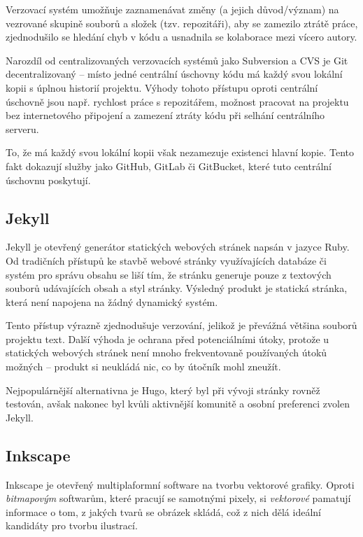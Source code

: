 \documentclass[a4paper, 12pt]{article}
\begin{document}
  Verzovací systém umožňuje zaznamenávat změny (a jejich důvod/význam) na vezrované skupině souborů a složek (tzv. repozitáři), aby se zamezilo ztrátě práce, zjednodušilo se hledání chyb v kódu a usnadnila se kolaborace mezi vícero autory.

  Narozdíl od centralizovaných verzovacích systémů jako Subversion a CVS je Git decentralizovaný -- místo jedné centrální úschovny kódu má každý svou lokální kopii s úplnou historií projektu. Výhody tohoto přístupu oproti centrální úschovně jsou např. rychlost práce s repozitářem, možnost pracovat na projektu bez internetového připojení a zamezení ztráty kódu při selhání centrálního serveru\cite{cvcs-vs-dvcs}.

  To, že má každý svou lokální kopii však nezamezuje existenci hlavní kopie. Tento fakt dokazují služby jako GitHub, GitLab či GitBucket, které tuto centrální úschovnu poskytují.


  \subsection{Jekyll} \label{sec:Jekyll}
  Jekyll je otevřený\cite{jekyll-source} generátor statických webových stránek napsán v jazyce Ruby. Od tradičních přístupů ke stavbě webové stránky využívajících databáze či systém pro správu obsahu se liší tím, že stránku generuje pouze z textových souborů udávajících obsah a styl stránky. Výsledný produkt je statická stránka, která není napojena na žádný dynamický systém.

  Tento přístup výrazně zjednodušuje verzování, jelikož je převážná většina souborů projektu text. Další výhoda je ochrana před potenciálními útoky, protože u statických webových stránek není mnoho frekventovaně používaných útoků možných -- produkt si neukládá nic, co by útočník mohl zneužít.

  Nejpopulárnější alternativna je Hugo, který byl při vývoji stránky rovněž testován, avšak nakonec byl kvůli aktivnější komunitě a osobní preferenci zvolen Jekyll.


  \subsection{Inkscape} \label{sec:Inkscape}
  Inkscape je otevřený\cite{inkscape-source} multiplaformní software na tvorbu vektorové grafiky. Oproti \emph{bitmapovým} softwarům, které pracují se samotnými pixely, si \emph{vektorové} pamatují informace o tom, z jakých tvarů se obrázek skládá, což z nich dělá ideální kandidáty pro tvorbu ilustrací.
\end{document}
